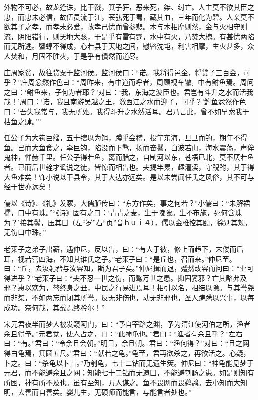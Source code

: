 \documentclass[]{article}
\begin{document}
外物不可必，故龙逢诛，比干戮，箕子狂，恶来死，桀、纣亡。人主莫不欲其臣之忠，而忠未必信，故伍员流于江，苌弘死于蜀，藏其血，三年而化为碧。人亲莫不欲其子之孝，而孝未必爱，故孝己忧而曾参悲。木与木相摩则然，金与火相守则流，阴阳错行，则天地大骇，于是乎有雷有霆，水中有火，乃焚大槐。有甚忧两陷而无所逃。螴蜳不得成，心若县于天地之间，慰暋沈屯，利害相摩，生火甚多，众人焚和，月固不胜火，于是乎有僓然而道尽。

庄周家贫，故往贷粟于监河侯。监河侯曰：``诺。我将得邑金，将贷子三百金，可乎？''庄周忿然作色曰：``周昨来，有中道而呼者，周顾视车辙，中有鲋鱼焉。周问之曰：`鲋鱼来，子何为者耶？'对曰：`我，东海之波臣也。君岂有斗升之水而活我哉！'周曰：`诺，我且南游吴越之王，激西江之水而迎子，可乎？'鲋鱼忿然作色曰：`吾失我常与，我无所处。我得斗升之水然活耳。君乃言此，曾不如早索我于枯鱼之肆。'''

任公子为大钩巨缁，五十犗以为饵，蹲乎会稽，投竿东海，旦旦而钓，期年不得鱼。已而大鱼食之，牵巨钩，陷没而下骛，扬而奋鬐，白波若山，海水震荡，声侔鬼神，惮赫千里。任公子得若鱼，离而腊之，自制河以东，苍梧已北，莫不厌若鱼者。已而后世辁才讽说之徒，皆惊而相告也。夫揭竿累，趣灌渎，守鲵鲋，其于得大鱼难矣！饰小说以干县令，其于大达亦远矣。是以未尝闻任氏之风俗，其不可与经于世亦远矣！

儒以《诗》、《礼》发冢，大儒胪传曰：``东方作矣，事之何若？''小儒曰：``未解裙襦，口中有珠。''``《诗》固有之曰：`青青之麦，生于陵陂。生不布施，死何含珠为？'接其鬓，压其囗（左``岁''右``页''音ｈｕｉ４），儒以金椎控其颐，徐别其颊，无伤口中珠。''

老莱子之弟子出薪，遇仲尼，反以告，曰：``有人于彼，修上而趋下，末偻而后耳，视若营四海，不知其谁氏之子。''老莱子曰：``是丘也，召而来。''仲尼至。曰：``丘，去汝躬矜与汝容知，斯为君子矣。''仲尼揖而退，蹙然改容而问曰：``业可得进乎？''老莱子曰：``夫不忍一世之伤，而骜万世之患。抑固窭邪？亡其略弗及邪？惠以欢为，骜终身之丑，中民之行易进焉耳！相引以名，相结以隐。与其誉尧而非桀，不如两忘而闭其所誉。反无非伤也，动无非邪也，圣人踌躇以兴事，以每成功。奈何哉，其载焉终矜尔！''

宋元君夜半而梦人被发窥阿门，曰：``予自宰路之渊，予为清江使河伯之所，渔者余且得予。''元君觉，使人占之，曰：``此神龟也。''君曰：``渔者有余且乎？''左右曰：``有。''君曰：``令余且会朝。''明日，余且朝。君曰：``渔何得？''对曰：``且之网得白龟焉，箕圆五尺。''君曰：``献若之龟。''龟至，君再欲杀之，再欲活之。心疑，卜之。曰：``杀龟以卜吉。''乃刳龟，七十二钻而无遗生筴。仲尼曰：``神龟能见梦于元君，而不能避余且之网；知能七十二钻而无遗囗，不能避刳肠之患。如是则知有所困，神有所不及也。虽有至知，万人谋之。鱼不畏网而畏鹈鹕。去小知而大知明，去善而自善矣。婴儿生，无硕师而能言，与能言者处也。''
\end{document}
